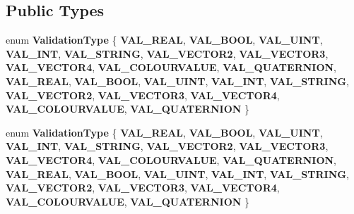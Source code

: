 \subsection*{Public Types}
\begin{DoxyCompactItemize}
\item 
\mbox{\label{classPUScriptTranslator_a918e9e974cd8d41d65b5106b7cc8dada}} 
enum {\bfseries Validation\+Type} \{ \newline
{\bfseries V\+A\+L\+\_\+\+R\+E\+AL}, 
{\bfseries V\+A\+L\+\_\+\+B\+O\+OL}, 
{\bfseries V\+A\+L\+\_\+\+U\+I\+NT}, 
{\bfseries V\+A\+L\+\_\+\+I\+NT}, 
\newline
{\bfseries V\+A\+L\+\_\+\+S\+T\+R\+I\+NG}, 
{\bfseries V\+A\+L\+\_\+\+V\+E\+C\+T\+O\+R2}, 
{\bfseries V\+A\+L\+\_\+\+V\+E\+C\+T\+O\+R3}, 
{\bfseries V\+A\+L\+\_\+\+V\+E\+C\+T\+O\+R4}, 
\newline
{\bfseries V\+A\+L\+\_\+\+C\+O\+L\+O\+U\+R\+V\+A\+L\+UE}, 
{\bfseries V\+A\+L\+\_\+\+Q\+U\+A\+T\+E\+R\+N\+I\+ON}, 
{\bfseries V\+A\+L\+\_\+\+R\+E\+AL}, 
{\bfseries V\+A\+L\+\_\+\+B\+O\+OL}, 
\newline
{\bfseries V\+A\+L\+\_\+\+U\+I\+NT}, 
{\bfseries V\+A\+L\+\_\+\+I\+NT}, 
{\bfseries V\+A\+L\+\_\+\+S\+T\+R\+I\+NG}, 
{\bfseries V\+A\+L\+\_\+\+V\+E\+C\+T\+O\+R2}, 
\newline
{\bfseries V\+A\+L\+\_\+\+V\+E\+C\+T\+O\+R3}, 
{\bfseries V\+A\+L\+\_\+\+V\+E\+C\+T\+O\+R4}, 
{\bfseries V\+A\+L\+\_\+\+C\+O\+L\+O\+U\+R\+V\+A\+L\+UE}, 
{\bfseries V\+A\+L\+\_\+\+Q\+U\+A\+T\+E\+R\+N\+I\+ON}
 \}
\item 
\mbox{\label{classPUScriptTranslator_a918e9e974cd8d41d65b5106b7cc8dada}} 
enum {\bfseries Validation\+Type} \{ \newline
{\bfseries V\+A\+L\+\_\+\+R\+E\+AL}, 
{\bfseries V\+A\+L\+\_\+\+B\+O\+OL}, 
{\bfseries V\+A\+L\+\_\+\+U\+I\+NT}, 
{\bfseries V\+A\+L\+\_\+\+I\+NT}, 
\newline
{\bfseries V\+A\+L\+\_\+\+S\+T\+R\+I\+NG}, 
{\bfseries V\+A\+L\+\_\+\+V\+E\+C\+T\+O\+R2}, 
{\bfseries V\+A\+L\+\_\+\+V\+E\+C\+T\+O\+R3}, 
{\bfseries V\+A\+L\+\_\+\+V\+E\+C\+T\+O\+R4}, 
\newline
{\bfseries V\+A\+L\+\_\+\+C\+O\+L\+O\+U\+R\+V\+A\+L\+UE}, 
{\bfseries V\+A\+L\+\_\+\+Q\+U\+A\+T\+E\+R\+N\+I\+ON}, 
{\bfseries V\+A\+L\+\_\+\+R\+E\+AL}, 
{\bfseries V\+A\+L\+\_\+\+B\+O\+OL}, 
\newline
{\bfseries V\+A\+L\+\_\+\+U\+I\+NT}, 
{\bfseries V\+A\+L\+\_\+\+I\+NT}, 
{\bfseries V\+A\+L\+\_\+\+S\+T\+R\+I\+NG}, 
{\bfseries V\+A\+L\+\_\+\+V\+E\+C\+T\+O\+R2}, 
\newline
{\bfseries V\+A\+L\+\_\+\+V\+E\+C\+T\+O\+R3}, 
{\bfseries V\+A\+L\+\_\+\+V\+E\+C\+T\+O\+R4}, 
{\bfseries V\+A\+L\+\_\+\+C\+O\+L\+O\+U\+R\+V\+A\+L\+UE}, 
{\bfseries V\+A\+L\+\_\+\+Q\+U\+A\+T\+E\+R\+N\+I\+ON}
 \}
\end{DoxyCompactItemize}
